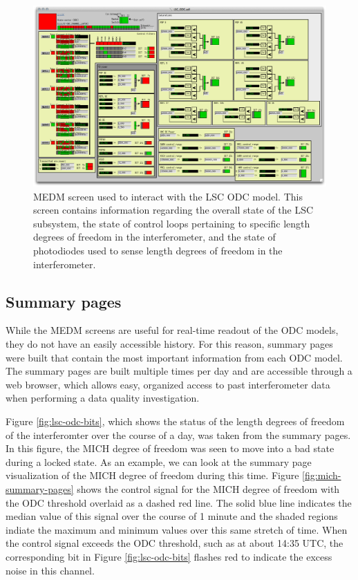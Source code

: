 \begin{figure}[ht!]
\includegraphics[width=\textwidth]{figures/ODC/LSC_screen}
\caption[LSC ODC Overview Screen]{MEDM screen used to interact with the LSC ODC model. %
         This screen contains information regarding the overall state of the LSC subsystem, %
         the state of control loops pertaining to specific length degrees of freedom in the %
         interferometer, and the state of photodiodes used to sense length degrees of freedom %
         in the interferometer.}
\label{fig:lsc-odc}
\end{figure}

\subsection{Summary pages}

While the MEDM screens are useful for real-time readout of the ODC models, they do not 
have an easily accessible history. For this reason, summary pages were built that 
contain the most important information from each ODC model. The summary pages are 
built multiple times per day and are accessible through a web browser, which allows 
easy, organized access to past interferometer data when performing a data 
quality investigation. 

Figure \ref{fig:lsc-odc-bits}, which shows the status of the length degrees of freedom 
of the interferomter over the course of a day, was taken from the summary pages. In this 
figure, the MICH degree of freedom was seen to move into a bad state during a locked state. 
As an example, we can look at the summary page visualization of the MICH degree of freedom 
during this time. 
Figure \ref{fig:mich-summary-pages} shows the control signal for the MICH degree of freedom 
with the ODC threshold 
overlaid as a dashed red line. The solid blue line indicates the median value of this signal 
over the course of 1 minute and the shaded regions indiate the maximum and minimum values over 
this same stretch of time. When the control signal exceeds the ODC threshold, such as at 
about 14:35 UTC, the corresponding bit in Figure \ref{fig:lsc-odc-bits} flashes red to 
indicate the excess noise in this channel. 

